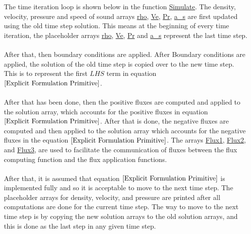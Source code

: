 The time iteration loop is shown below in the function \url{Simulate}. The density, velocity, pressure and speed of sound arrays \url{rho}, \url{Ve}, \url{Pr}, \url{a_s} are first updated using the old time step solution. This means at the beginning of every time iteration, the placeholder arrays \url{rho}, \url{Ve}, \url{Pr} and \url{a_s} represent the last time step. 
\\~\\After that, then boundary conditions are applied. After Boundary conditions are applied, the solution of the old time step is copied over to the new time step. This is to represent the first $LHS$ term in equation $\ref{Explicit Formulation Primitive}$.
\\~\\After that has been done, then the positive fluxes are computed and applied to the solution array, which accounts for the positive fluxes in equation $\ref{Explicit Formulation Primitive}$. After that is done, the negative fluxes are computed and then applied to the solution array which accounts for the negative fluxes in the equation $\ref{Explicit Formulation Primitive}$. The arrays \url{Flux1}, \url{Flux2}, and \url{Flux3}, are used to facilitate the communication of fluxes between the flux computing function and the flux application functions.
\\~\\After that, it is assumed that equation $\ref{Explicit Formulation Primitive}$ is implemented fully and so it is acceptable to move to the next time step. The placeholder arrays for density, velocity, and pressure are printed after all computations are done for the current time step. The way to move to the next time step is by copying the new solution arrays to the old solution arrays, and this is done as the last step in any given time step.
